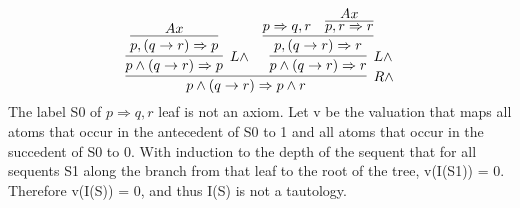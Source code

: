 \documentclass[11pt]{article}
\newcommand{\imp}{\rightarrow}
\newcommand{\en}{\wedge}
\newcommand{\seq}{\Rightarrow}
\begin{document}
\[
\infer[R \en]{p \en (q\imp r) \seq p \en r}{
{\infer[L \en]{p \en (q \imp r)\seq p}
{\infer[]{p,(q \imp r)\seq p}{Ax}}
}&
{\infer[L \en]{p \en (q \imp r)\seq r}
{\infer[]{p,(q \imp r)\seq r}{{p \seq q,r}&
{\infer[]{p,r \seq r}{Ax}}
}}}}
\] 
The label S0 of  $p \seq q,r$ leaf is not an axiom. Let v be
the valuation that maps all atoms that occur in the antecedent of S0 to 1 and
all atoms that occur in the succedent of S0 to 0.
With induction to the depth of the sequent that for all sequents S1 along
the branch from that leaf to the root of the tree, v(I(S1)) = 0. Therefore
v(I(S)) = 0, and thus I(S) is not a tautology. 

\clearpage 
\end{document}
